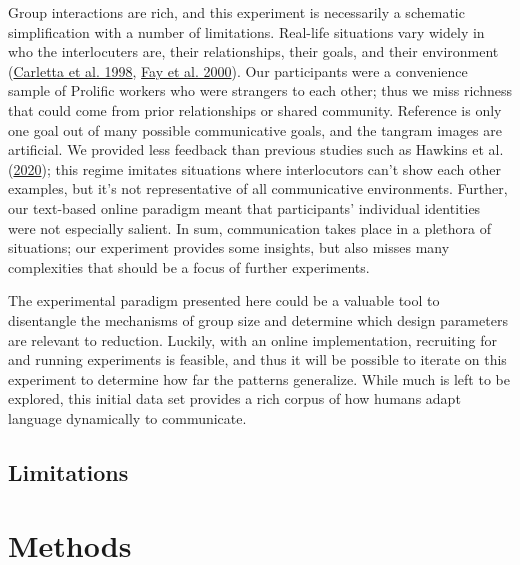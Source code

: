 \documentclass[
  english,
  a4paper,
]{article}
\begin{document}
Group interactions are rich, and this experiment is necessarily a schematic simplification with a number of limitations. Real-life situations vary widely in who the interlocuters are, their relationships, their goals, and their environment (\protect\hyperlink{ref-carletta1998}{Carletta et al. 1998}, \protect\hyperlink{ref-fay2000}{Fay et al. 2000}). Our participants were a convenience sample of Prolific workers who were strangers to each other; thus we miss richness that could come from prior relationships or shared community. Reference is only one goal out of many possible communicative goals, and the tangram images are artificial.
We provided less feedback than previous studies such as Hawkins et al. (\protect\hyperlink{ref-hawkinsCharacterizingDynamicsLearning2020}{2020}); this regime imitates situations where interlocutors can't show each other examples, but it's not representative of all communicative environments. Further, our text-based online paradigm meant that participants' individual identities were not especially salient. In sum, communication takes place in a plethora of situations; our experiment provides some insights, but also misses many complexities that should be a focus of further experiments.

The experimental paradigm presented here could be a valuable tool to disentangle the mechanisms of group size and determine which design parameters are relevant to reduction. Luckily, with an online implementation, recruiting for and running experiments is feasible, and thus it will be possible to iterate on this experiment to determine how far the patterns generalize. While much is left to be explored, this initial data set provides a rich corpus of how humans adapt language dynamically to communicate.

\hypertarget{limitations}{%
\subsection{Limitations}\label{limitations}}

\hypertarget{methods}{%
\section{Methods}\label{methods}}
\end{document}
